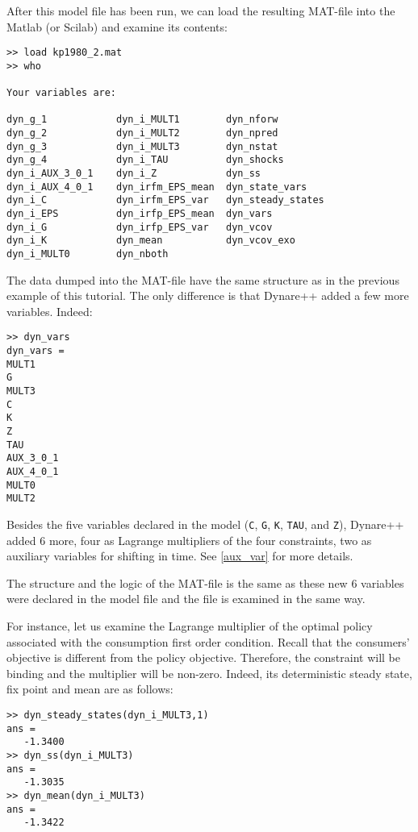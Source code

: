 \documentclass[10pt]{article}
\begin{document}
After this model file has been run, we can load the resulting MAT-file
into the Matlab (or Scilab) and examine its contents:
{\small
\begin{verbatim}
>> load kp1980_2.mat
>> who

Your variables are:

dyn_g_1            dyn_i_MULT1        dyn_nforw          
dyn_g_2            dyn_i_MULT2        dyn_npred          
dyn_g_3            dyn_i_MULT3        dyn_nstat          
dyn_g_4            dyn_i_TAU          dyn_shocks         
dyn_i_AUX_3_0_1    dyn_i_Z            dyn_ss             
dyn_i_AUX_4_0_1    dyn_irfm_EPS_mean  dyn_state_vars     
dyn_i_C            dyn_irfm_EPS_var   dyn_steady_states  
dyn_i_EPS          dyn_irfp_EPS_mean  dyn_vars           
dyn_i_G            dyn_irfp_EPS_var   dyn_vcov           
dyn_i_K            dyn_mean           dyn_vcov_exo       
dyn_i_MULT0        dyn_nboth          
\end{verbatim}
}

The data dumped into the MAT-file have the same structure as in the
previous example of this tutorial. The only difference is that
Dynare++ added a few more variables. Indeed:
{\small
\begin{verbatim}
>> dyn_vars
dyn_vars =
MULT1    
G        
MULT3    
C        
K        
Z        
TAU      
AUX_3_0_1
AUX_4_0_1
MULT0    
MULT2    
\end{verbatim}
}
Besides the five variables declared in the model ({\tt C}, {\tt G},
{\tt K}, {\tt TAU}, and {\tt Z}), Dy\-na\-re++ added 6 more, four as Lagrange
multipliers of the four constraints, two as auxiliary variables for
shifting in time. See \ref{aux_var} for more details.

The structure and the logic of the MAT-file is the same as these new 6
variables were declared in the model file and the file is examined in
the same way.

For instance, let us examine the Lagrange multiplier of the optimal
policy associated with the consumption first order condition. Recall
that the consumers' objective is different from the policy
objective. Therefore, the constraint will be binding and the
multiplier will be non-zero. Indeed, its deterministic steady state,
fix point and mean are as follows:
{\small
\begin{verbatim}
>> dyn_steady_states(dyn_i_MULT3,1)
ans =
   -1.3400
>> dyn_ss(dyn_i_MULT3)
ans =
   -1.3035
>> dyn_mean(dyn_i_MULT3)
ans =
   -1.3422
\end{verbatim}
}
\end{document}
